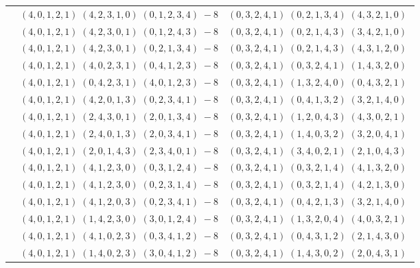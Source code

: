 \documentclass[11pt]{article}
\begin{document}
\begin{longtable}[l]{|c|c|c|}
 \cline{2-3} 
 & $(4 ,0 ,1 ,2 ,1) \;(4 ,2 ,3 ,1 ,0) \;(0 ,1 ,2 ,3 ,4) \;-8$ & $(0 ,3 ,2 ,4 ,1) \;(0 ,2 ,1 ,3 ,4) \;(4 ,3 ,2 ,1 ,0) \;$\\ 
 \cline{2-3} 
 & $(4 ,0 ,1 ,2 ,1) \;(4 ,2 ,3 ,0 ,1) \;(0 ,1 ,2 ,4 ,3) \;-8$ & $(0 ,3 ,2 ,4 ,1) \;(0 ,2 ,1 ,4 ,3) \;(3 ,4 ,2 ,1 ,0) \;$\\ 
 \cline{2-3} 
 & $(4 ,0 ,1 ,2 ,1) \;(4 ,2 ,3 ,0 ,1) \;(0 ,2 ,1 ,3 ,4) \;-8$ & $(0 ,3 ,2 ,4 ,1) \;(0 ,2 ,1 ,4 ,3) \;(4 ,3 ,1 ,2 ,0) \;$\\ 
 \cline{2-3} 
 & $(4 ,0 ,1 ,2 ,1) \;(4 ,0 ,2 ,3 ,1) \;(0 ,4 ,1 ,2 ,3) \;-8$ & $(0 ,3 ,2 ,4 ,1) \;(0 ,3 ,2 ,4 ,1) \;(1 ,4 ,3 ,2 ,0) \;$\\ 
 \cline{2-3} 
 & $(4 ,0 ,1 ,2 ,1) \;(0 ,4 ,2 ,3 ,1) \;(4 ,0 ,1 ,2 ,3) \;-8$ & $(0 ,3 ,2 ,4 ,1) \;(1 ,3 ,2 ,4 ,0) \;(0 ,4 ,3 ,2 ,1) \;$\\ 
 \cline{2-3} 
 & $(4 ,0 ,1 ,2 ,1) \;(4 ,2 ,0 ,1 ,3) \;(0 ,2 ,3 ,4 ,1) \;-8$ & $(0 ,3 ,2 ,4 ,1) \;(0 ,4 ,1 ,3 ,2) \;(3 ,2 ,1 ,4 ,0) \;$\\ 
 \cline{2-3} 
 & $(4 ,0 ,1 ,2 ,1) \;(2 ,4 ,3 ,0 ,1) \;(2 ,0 ,1 ,3 ,4) \;-8$ & $(0 ,3 ,2 ,4 ,1) \;(1 ,2 ,0 ,4 ,3) \;(4 ,3 ,0 ,2 ,1) \;$\\ 
 \cline{2-3} 
 & $(4 ,0 ,1 ,2 ,1) \;(2 ,4 ,0 ,1 ,3) \;(2 ,0 ,3 ,4 ,1) \;-8$ & $(0 ,3 ,2 ,4 ,1) \;(1 ,4 ,0 ,3 ,2) \;(3 ,2 ,0 ,4 ,1) \;$\\ 
 \cline{2-3} 
 & $(4 ,0 ,1 ,2 ,1) \;(2 ,0 ,1 ,4 ,3) \;(2 ,3 ,4 ,0 ,1) \;-8$ & $(0 ,3 ,2 ,4 ,1) \;(3 ,4 ,0 ,2 ,1) \;(2 ,1 ,0 ,4 ,3) \;$\\ 
 \cline{2-3} 
 & $(4 ,0 ,1 ,2 ,1) \;(4 ,1 ,2 ,3 ,0) \;(0 ,3 ,1 ,2 ,4) \;-8$ & $(0 ,3 ,2 ,4 ,1) \;(0 ,3 ,2 ,1 ,4) \;(4 ,1 ,3 ,2 ,0) \;$\\ 
 \cline{2-3} 
 & $(4 ,0 ,1 ,2 ,1) \;(4 ,1 ,2 ,3 ,0) \;(0 ,2 ,3 ,1 ,4) \;-8$ & $(0 ,3 ,2 ,4 ,1) \;(0 ,3 ,2 ,1 ,4) \;(4 ,2 ,1 ,3 ,0) \;$\\ 
 \cline{2-3} 
 & $(4 ,0 ,1 ,2 ,1) \;(4 ,1 ,2 ,0 ,3) \;(0 ,2 ,3 ,4 ,1) \;-8$ & $(0 ,3 ,2 ,4 ,1) \;(0 ,4 ,2 ,1 ,3) \;(3 ,2 ,1 ,4 ,0) \;$\\ 
 \cline{2-3} 
 & $(4 ,0 ,1 ,2 ,1) \;(1 ,4 ,2 ,3 ,0) \;(3 ,0 ,1 ,2 ,4) \;-8$ & $(0 ,3 ,2 ,4 ,1) \;(1 ,3 ,2 ,0 ,4) \;(4 ,0 ,3 ,2 ,1) \;$\\ 
 \cline{2-3} 
 & $(4 ,0 ,1 ,2 ,1) \;(4 ,1 ,0 ,2 ,3) \;(0 ,3 ,4 ,1 ,2) \;-8$ & $(0 ,3 ,2 ,4 ,1) \;(0 ,4 ,3 ,1 ,2) \;(2 ,1 ,4 ,3 ,0) \;$\\ 
 \cline{2-3} 
 & $(4 ,0 ,1 ,2 ,1) \;(1 ,4 ,0 ,2 ,3) \;(3 ,0 ,4 ,1 ,2) \;-8$ & $(0 ,3 ,2 ,4 ,1) \;(1 ,4 ,3 ,0 ,2) \;(2 ,0 ,4 ,3 ,1) \;$\\ 

\end{longtable}
\end{document}
